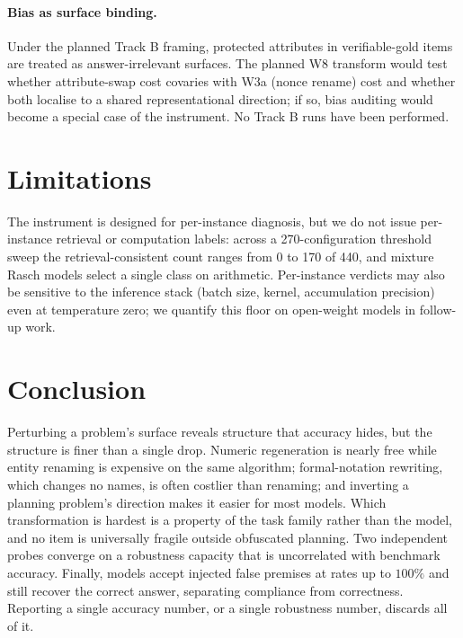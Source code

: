 \documentclass{article}
\begin{document}
\paragraph{Bias as surface binding.} Under the planned Track B framing, protected
attributes in verifiable-gold items are treated as answer-irrelevant surfaces. The
planned W8 transform would test whether attribute-swap cost covaries with W3a
(nonce rename) cost and whether both localise to a shared representational
direction; if so, bias auditing would become a special case of the instrument.
No Track B runs have been performed.

\section{Limitations}

The instrument is designed for per-instance diagnosis, but we do not issue
per-instance retrieval or computation labels: across a 270-configuration threshold
sweep the retrieval-consistent count ranges from 0 to 170 of 440, and mixture Rasch
models select a single class on arithmetic. Per-instance verdicts may also be
sensitive to the inference stack (batch size, kernel, accumulation precision) even at
temperature zero; we quantify this floor on open-weight models in follow-up work.

\section{Conclusion}

Perturbing a problem's surface reveals structure that accuracy hides, but the
structure is finer than a single drop. Numeric regeneration is nearly free while
entity renaming is expensive on the same algorithm; formal-notation rewriting, which
changes no names, is often costlier than renaming; and inverting a planning problem's
direction makes it easier for most models. Which transformation is hardest is a
property of the task family rather than the model, and no item is universally
fragile outside obfuscated planning. Two independent probes converge on a robustness
capacity that is uncorrelated with benchmark accuracy. Finally, models accept
injected false premises at rates up to $100\%$ and still recover the correct answer,
separating compliance from correctness. Reporting a single accuracy number, or a
single robustness number, discards all of it.



\end{document}
